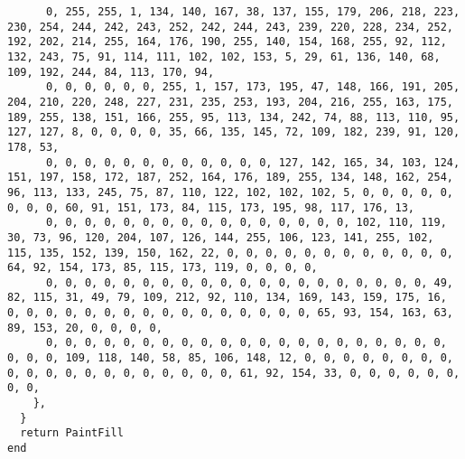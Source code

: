 \documentclass{ctexart}
\begin{document}
\begin{lstlisting}
      0, 255, 255, 1, 134, 140, 167, 38, 137, 155, 179, 206, 218, 223, 230, 254, 244, 242, 243, 252, 242, 244, 243, 239, 220, 228, 234, 252, 192, 202, 214, 255, 164, 176, 190, 255, 140, 154, 168, 255, 92, 112, 132, 243, 75, 91, 114, 111, 102, 102, 153, 5, 29, 61, 136, 140, 68, 109, 192, 244, 84, 113, 170, 94, 
      0, 0, 0, 0, 0, 0, 255, 1, 157, 173, 195, 47, 148, 166, 191, 205, 204, 210, 220, 248, 227, 231, 235, 253, 193, 204, 216, 255, 163, 175, 189, 255, 138, 151, 166, 255, 95, 113, 134, 242, 74, 88, 113, 110, 95, 127, 127, 8, 0, 0, 0, 0, 35, 66, 135, 145, 72, 109, 182, 239, 91, 120, 178, 53, 
      0, 0, 0, 0, 0, 0, 0, 0, 0, 0, 0, 0, 127, 142, 165, 34, 103, 124, 151, 197, 158, 172, 187, 252, 164, 176, 189, 255, 134, 148, 162, 254, 96, 113, 133, 245, 75, 87, 110, 122, 102, 102, 102, 5, 0, 0, 0, 0, 0, 0, 0, 0, 60, 91, 151, 173, 84, 115, 173, 195, 98, 117, 176, 13, 
      0, 0, 0, 0, 0, 0, 0, 0, 0, 0, 0, 0, 0, 0, 0, 0, 102, 110, 119, 30, 73, 96, 120, 204, 107, 126, 144, 255, 106, 123, 141, 255, 102, 115, 135, 152, 139, 150, 162, 22, 0, 0, 0, 0, 0, 0, 0, 0, 0, 0, 0, 0, 64, 92, 154, 173, 85, 115, 173, 119, 0, 0, 0, 0, 
      0, 0, 0, 0, 0, 0, 0, 0, 0, 0, 0, 0, 0, 0, 0, 0, 0, 0, 0, 0, 49, 82, 115, 31, 49, 79, 109, 212, 92, 110, 134, 169, 143, 159, 175, 16, 0, 0, 0, 0, 0, 0, 0, 0, 0, 0, 0, 0, 0, 0, 0, 0, 65, 93, 154, 163, 63, 89, 153, 20, 0, 0, 0, 0, 
      0, 0, 0, 0, 0, 0, 0, 0, 0, 0, 0, 0, 0, 0, 0, 0, 0, 0, 0, 0, 0, 0, 0, 0, 109, 118, 140, 58, 85, 106, 148, 12, 0, 0, 0, 0, 0, 0, 0, 0, 0, 0, 0, 0, 0, 0, 0, 0, 0, 0, 0, 0, 61, 92, 154, 33, 0, 0, 0, 0, 0, 0, 0, 0, 
    },
  }
  return PaintFill
end


\end{lstlisting}
\end{document}
